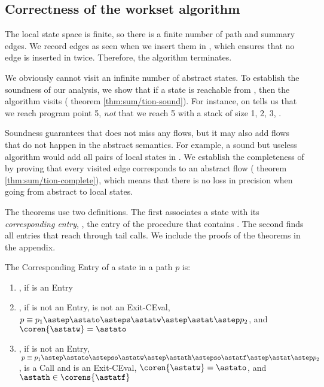 \documentclass{LMCS}
\theoremstyle{definition} \newtheorem{property}[thm]{Property}
\begin{document}
\subsection{Correctness of the workset algorithm}

The local state space is finite, so there is a finite number of path and 
summary edges.
We record edges as seen when we insert them in \work{},
which ensures that no edge is inserted in \work{} twice.
Therefore, the algorithm terminates.

We obviously cannot visit an infinite number of abstract states.
To establish the soundness of our analysis, we show that if a state \astat{} is
reachable from \ainitstate, then the algorithm visits \atol{\astat} 
(\confer{} theorem \ref{thm:sum/tion-sound}). 
For instance, \cfat{} on  tells us that we reach program point 5, 
\emph{not} that we reach 5 with a stack of size 1, 2, 3, \etc.

Soundness guarantees that \cfat{} does not miss any flows,
but it may also add flows that do not happen in the abstract semantics.
For example, a sound but useless algorithm would add all pairs of local states 
in \seen{}.
We establish the completeness of \cfat{} by proving that every visited
edge corresponds to an abstract flow (\confer{} theorem 
\ref{thm:sum/tion-complete}), which means that there is no loss in precision 
when going from abstract to local states.

The theorems use two definitions.
The first associates a state \astat{} with its \emph{corresponding entry},
\ie{}, the entry of the procedure that contains \astat.
The second finds all entries that reach \coren{\astat} through tail calls.
We include the proofs of the theorems in the appendix.
\begin{defi}
  The Corresponding Entry \coren{\astat} of a state {\astat} in a path $p$ is:
  \begin{enumerate}[$\bullet$]
  \item
    \astat, if {\astat} is an Entry
  \item
    \astato, if {\astat} is not an Entry, \astatw{} is not an Exit-CEval,
    $p \equiv p_1 \astep \astato \asteps \astatw \astep \astat \astep p_2$,
    and $\coren{\astatw} = \astato$
  \item
    \astato, if {\astat} is not an Entry, 
    $\:p \equiv p_1 \astep \astato \astepso \astatw \astep \astath
    \astepso \astatf \astep \astat \astep p_2$, \astatw{} is a Call 
    and \astatf{} is an Exit-CEval, $\coren{\astatw} = \astato$, and 
    $\astath \in \corens{\astatf}$
  \end{enumerate}
\end{defi}
\end{document}
